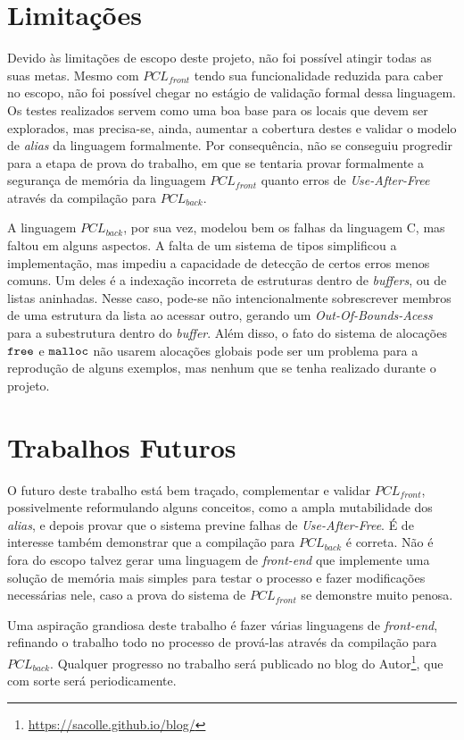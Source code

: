 \section{Limitações}

Devido às limitações de escopo deste projeto, não foi possível atingir todas as suas metas. Mesmo com $PCL_{front}$ tendo sua funcionalidade reduzida para caber no escopo, não foi possível chegar no estágio de validação formal dessa linguagem. Os testes realizados servem como uma boa base para os locais que devem ser explorados, mas precisa-se, ainda, aumentar a cobertura destes e validar o modelo de \emph{alias} da linguagem formalmente. Por consequência, não se conseguiu progredir para a etapa de prova do trabalho, em que se tentaria provar formalmente a segurança de memória da linguagem $PCL_{front}$ quanto erros de \emph{Use-After-Free} através da compilação para $PCL_{back}$.

A linguagem $PCL_{back}$, por sua vez, modelou bem os falhas da linguagem C, mas faltou em alguns aspectos. A falta de um sistema de tipos simplificou a implementação, mas impediu a capacidade de detecção de certos erros menos comuns. Um deles é a indexação incorreta de estruturas dentro de \emph{buffers}, ou de listas aninhadas. Nesse caso, pode-se não intencionalmente sobrescrever membros de uma estrutura da lista ao acessar outro, gerando um \emph{Out-Of-Bounds-Acess} para a subestrutura dentro do \emph{buffer}. Além disso, o fato do sistema de alocações $\texttt{free}$ e $\texttt{malloc}$ não usarem alocações globais pode ser um problema para a reprodução de alguns exemplos, mas nenhum que se tenha realizado durante o projeto.

\section{Trabalhos Futuros}

O futuro deste trabalho está bem traçado, complementar e validar $PCL_{front}$, possivelmente reformulando alguns conceitos, como a ampla mutabilidade dos \emph{alias}, e depois provar que o sistema previne falhas de \emph{Use-After-Free}. É de interesse também demonstrar que a compilação para $PCL_{back}$ é correta. Não é fora do escopo talvez gerar uma linguagem de \emph{front-end} que implemente uma solução de memória mais simples para testar o processo e fazer modificações necessárias nele, caso a prova do sistema de $PCL_{front}$ se demonstre muito penosa.

Uma aspiração grandiosa deste trabalho é fazer várias linguagens de \emph{front-end}, refinando o trabalho todo no processo de prová-las através da compilação para $PCL_{back}$. Qualquer progresso no trabalho será publicado no blog do Autor\footnote{\url{https://sacolle.github.io/blog/}}, que com sorte será periodicamente. 